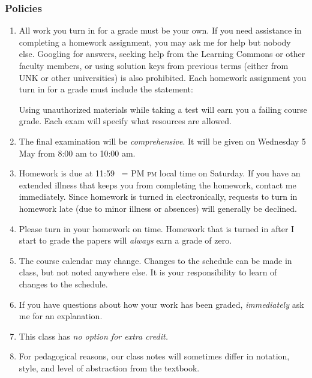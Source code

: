 \documentclass[12pt,fullpage]{article}
\makeatletter
\newcounter{ex}\setcounter{ex}{0}
\DeclareRobustCommand{\maybefakesc}[1]{%
  \ifnum\pdfstrcmp{\f@series}{\bfdefault}=\z@
    {\fontsize{\dimexpr0.8\dimexpr\f@size pt\relax}{0}\selectfont\uppercase{#1}}%
  \else
    \textsc{#1}%
  \fi
}
\newcommand\PM{\,\maybefakesc{pm}\xspace}
\makeatother
\begin{document}
\subsubsection* {Policies}


\begin{enumerate}

\item All work you turn in for a grade must be your own.  If you need assistance in completing a homework assignment, you may ask me for help but nobody else. Googling for
answers, seeking help from the Learning Commons or other faculty members,  or using solution keys from previous terms (either from UNK or other universities) is also prohibited.  Each homework assignment you turn in for a grade must include the statement:

\begin{quote}
\end{quote}
Using unauthorized materials while taking a test will earn you a failing course grade. Each exam will specify what resources are allowed. 

 \item The final examination will be \emph{comprehensive}. It will be given on Wednesday 5 May from 8:00 am to 10:00 am.


 \item Homework is due at 11:59 \PM local time on Saturday. If you have an 
 extended illness that keeps you from completing the homework, contact
  me immediately. Since homework is turned in electronically, requests to 
turn in homework late (due to minor illness or absences) will generally be declined.

\item Please turn in your homework on time. Homework that is turned in after I start to grade the
papers will \emph{always} earn a grade of zero. 

\item The course calendar may change. Changes to the schedule can be made in class, but 
not noted anywhere else. It is your responsibility to
learn of changes to the schedule.



\item If you have questions about how your work has been graded,  \emph{immediately}  ask me for an explanation.

\item This class has \emph{no option for extra credit.}


\item  For pedagogical reasons, our class notes will sometimes differ in notation, 
style, and level of abstraction from the textbook.


\end{enumerate}
\end{document}
